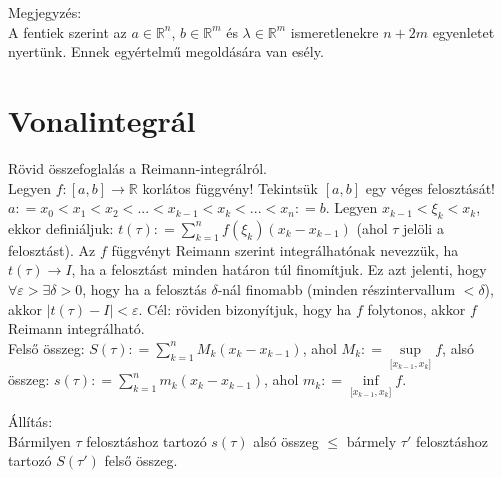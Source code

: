 \documentclass[12pt,a4paper]{scrartcl}
\newenvironment{allitas}{}{}
\newenvironment{megjegyzes}{}{}
\begin{document}
\begin{megjegyzes}

Megjegyzés:\\
A fentiek szerint az \(a \in {\mathbb{R}}^{n}\),
\(b \in {\mathbb{R}}^{m}\) és \(\lambda \in {\mathbb{R}}^{m}\)
ismeretlenekre \(n + 2m\) egyenletet nyertünk. Ennek egyértelmű
megoldására van esély.

\end{megjegyzes}

\hypertarget{vonalintegral}{%
\section{Vonalintegrál}\label{vonalintegral}}

Rövid összefoglalás a Reimann-integrálról.\\
Legyen
\(\left. f:\left\lbrack {a,b} \right\rbrack\rightarrow{\mathbb{R}} \right.\)
korlátos függvény! Tekintsük \(\left\lbrack {a,b} \right\rbrack\) egy
véges felosztását!
\(a: = x_{0} < x_{1} < x_{2} < ... < x_{k - 1} < x_{k} < ... < x_{n}: = b\).
Legyen \(x_{k - 1} < \xi_{k} < x_{k}\), ekkor definiáljuk:
\(t\left( \tau \right): = {\sum\limits_{k = 1}^{n}{f\left( \xi_{k} \right)}}\left( {x_{k} - x_{k - 1}} \right)\)
(ahol \(\tau\) jelöli a felosztást). Az \(f\) függvényt Reimann szerint
integrálhatónak nevezzük, ha
\(\left. t\left( \tau \right)\rightarrow I \right.\), ha a felosztást
minden határon túl finomítjuk. Ez azt jelenti, hogy
\(\forall\varepsilon > \exists\delta > 0\), hogy ha a felosztás
\(\delta\)-nál finomabb (minden részintervallum \(< \delta\)), akkor
\(\left| {t\left( \tau \right) - I} \right| < \varepsilon\). Cél:
röviden bizonyítjuk, hogy ha \(f\) folytonos, akkor \(f\) Reimann
integrálható.\\
Felső összeg:
\(S\left( \tau \right): = {\sum\limits_{k = 1}^{n}{M_{k}\left( {x_{k} - x_{k - 1}} \right)}}\),
ahol \(M_{k}: = \sup\limits_{\lbrack{x_{k - 1},x_{k}}\rbrack}f\), alsó
összeg:
\(s\left( \tau \right): = {\sum\limits_{k = 1}^{n}{m_{k}\left( {x_{k} - x_{k - 1}} \right)}}\),
ahol \(m_{k}: = \inf\limits_{\lbrack{x_{k - 1},x_{k}}\rbrack}f\).

\begin{allitas}

Állítás:\\
Bármilyen \(\tau\) felosztáshoz tartozó \(s\left( \tau \right)\) alsó
összeg \(\leq\) bármely \(\tau'\) felosztáshoz tartozó
\(S\left( {\tau'} \right)\) felső összeg.

\end{allitas}
\end{document}
